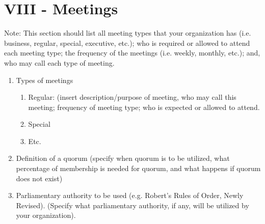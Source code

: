 
\section{VIII - Meetings}
Note:  This section should list all meeting types that your organization has
(i.e. business, regular, special, executive, etc.); who is required or allowed
to attend each meeting type; the frequency of the meetings (i.e. weekly,
monthly, etc.); and, who may call each type of meeting. 
\begin{enumerate}
  \item	Types of meetings
    \begin{enumerate}
      \item	Regular:  (insert description/purpose of meeting, who may call this
      meeting; frequency of meeting type; who is expected or allowed to attend.
      \item	Special
      \item	Etc.
    \end{enumerate}
  \item	Definition of a quorum (specify when quorum is to be utilized, what
  percentage of membership is needed for quorum, and what happens if quorum does
  not exist)
  \item	Parliamentary authority to be used (e.g. Robert’s Rules of Order, Newly
  Revised).  (Specify what parliamentary authority, if any, will be utilized by
  your organization).
\end{enumerate}
